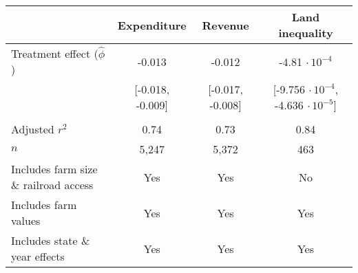 	\begin{tabular}{@{}lccc@{}}
		\toprule
		& Expenditure             & Revenue                 & Land inequality \\ \midrule
		Treatment effect ($\hat{\phi}$) & -0.013  &  -0.012  &   -4.81 $\cdot\,10^{-4}$        \\
										 &  [-0.018, -0.009] &  [-0.017, -0.008] &   [-9.756 $\cdot\,10^{-4}$, -4.636 $\cdot\,10^{-5}$]         \\
									  &                   &                    &          \\
		Adjusted $r^2$                           & 0.74                    & 0.73                    &   0.84         \\
		$n$                             & 5,247                   & 5,372                  &  463          \\
		Includes farm size \& railroad access                      & Yes                  & Yes                 &  No         \\
		Includes farm values                      & Yes                  & Yes                 &  Yes         \\
		Includes state \& year effects               & Yes                  & Yes                 &  Yes         \\
		 \bottomrule
	\end{tabular}
